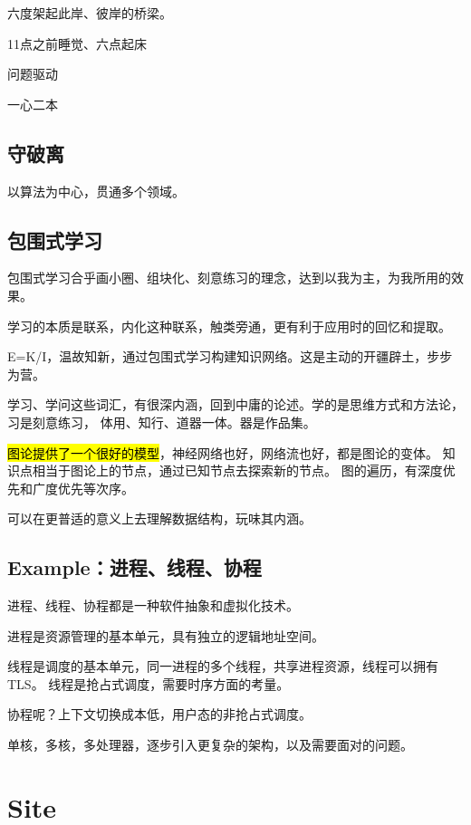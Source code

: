 六度架起此岸、彼岸的桥梁。

\begin{enumbox}
\item 11点之前睡觉、六点起床
\item 问题驱动
\item 一心二本
\end{enumbox}

\subsection{守破离}

以算法为中心，贯通多个领域。

\subsection{包围式学习}

包围式学习合乎画小圈、组块化、刻意练习的理念，达到以我为主，为我所用的效果。

学习的本质是联系，内化这种联系，触类旁通，更有利于应用时的回忆和提取。

E=K/I，温故知新，通过包围式学习构建知识网络。这是主动的开疆辟土，步步为营。

学习、学问这些词汇，有很深内涵，回到中庸的论述。学的是思维方式和方法论，习是刻意练习，
体用、知行、道器一体。器是作品集。

\hl{图论提供了一个很好的模型}，神经网络也好，网络流也好，都是图论的变体。
知识点相当于图论上的节点，通过已知节点去探索新的节点。
图的遍历，有深度优先和广度优先等次序。

可以在更普适的意义上去理解数据结构，玩味其内涵。

\subsection{Example：进程、线程、协程}

进程、线程、协程都是一种软件抽象和虚拟化技术。

进程是资源管理的基本单元，具有独立的逻辑地址空间。

线程是调度的基本单元，同一进程的多个线程，共享进程资源，线程可以拥有TLS。
线程是抢占式调度，需要时序方面的考量。

协程呢？上下文切换成本低，用户态的非抢占式调度。

单核，多核，多处理器，逐步引入更复杂的架构，以及需要面对的问题。


\section{Site}

